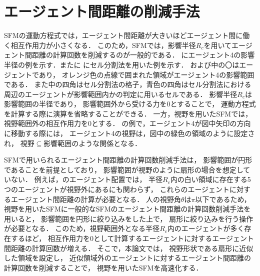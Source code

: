 \chapter{エージェント間距離の削減手法}
\label{sec:method}
SFMの運動方程式では，エージェント間距離が大きいほどエージェント間に働く相互作用力が小さくなる．
このため，SFMでは，影響半径$R_{c}$を用いてエージェント間距離の計算回数を削減するのが一般的である．
にエージェント4の影響半径の例を示す．またに
にセル分割法を用いた例を示す．
%
%
%
および中の〇はエージェントであり，
オレンジ色の点線で囲まれた領域がエージェント4の影響範囲である．
また中の四角はセル分割法の格子，青色の四角はセル分割法における
周辺のエージェントが影響範囲内かの判定に用いるセルである．
影響半径$R_{c}$は影響範囲の半径であり，
影響範囲外から受ける力を0とすることで，
運動方程式を計算する際に演算を省略することができる．
一方，視野を用いたSFMでは，視野範囲外の相互作用力を0とする．
の例で，エージェント4が図中矢印の方向に移動する際には，
エージェント4の視野は，図中の緑色の領域のように設定され，
視野$\subseteq$影響範囲のような関係となる．

SFMで用いられるエージェント間距離の計算回数削減手法は，
影響範囲が円形であることを前提としており，
影響範囲が視野のように扇形の場合を想定していない．
例えば，のエージェント配置では，
半径$R_{c}$内の白い領域に存在する5つのエージェントが視野外にあるにも関わらず，
これらのエージェントに対するエージェント間距離の計算が必要となる．
人の視野角$\theta$は$\pi$以下であるため，
視野を用いたSFMに一般的なSFMのエージェント間距離の計算回数削減手法を用いると，
影響範囲を円形に絞り込みをした上で，%
扇形に絞り込みを行う操作が必要となる．
このため，視野範囲外となる半径$R_{c}$内のエージェントが多く存在するほど，
相互作用力を0として計算するエージェントに対するエージェント間距離の計算回数が増える．
そこで，本論文では，
視野形状である扇形に近似した領域を設定し，
近似領域外のエージェントに対するエージェント間距離の計算回数を削減することで，
視野を用いたSFMを高速化する．

